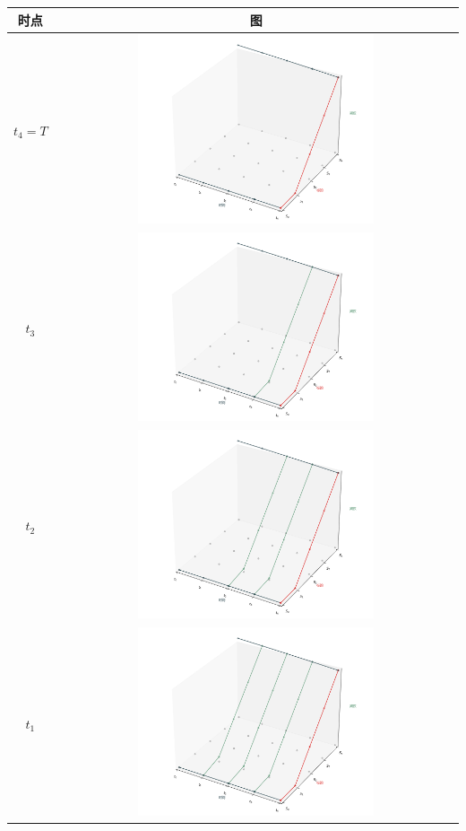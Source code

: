 \documentclass{article}
\begin{document}
\begin{longtable}{|c|c|}
    \hline
    时点 & 图 \\
    \hline
    $t_4 = T$ & \includegraphics[width=0.6\textwidth]{Images/5_option_price_surface_4iter_step0.png} \\
    \hline
    $t_3$ & \includegraphics[width=0.6\textwidth]{Images/6_option_price_surface_4iter_step1.png} \\
    \hline
    $t_2$ & \includegraphics[width=0.6\textwidth]{Images/7_option_price_surface_4iter_step2.png} \\
    \hline
    $t_1$ & \includegraphics[width=0.6\textwidth]{Images/8_option_price_surface_4iter_step3.png} \\

\end{longtable}
\end{document}
